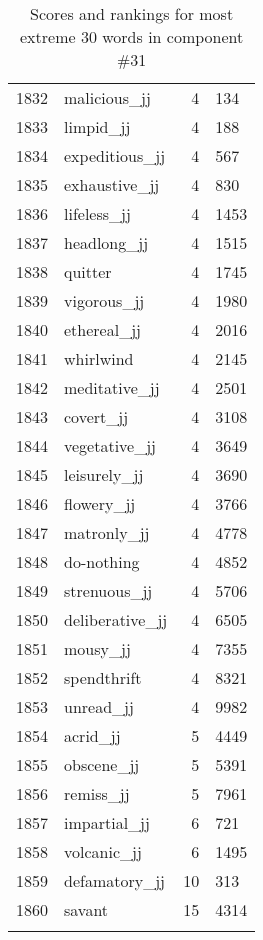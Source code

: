 \begin{longtable}[!htbp]{| rlr@{.}l |}
    1832 & malicious\_jj & 4 & 134 \\
    1833 & limpid\_jj & 4 & 188 \\
    1834 & expeditious\_jj & 4 & 567 \\
    1835 & exhaustive\_jj & 4 & 830 \\
    1836 & lifeless\_jj & 4 & 1453 \\
    1837 & headlong\_jj & 4 & 1515 \\
    1838 & quitter & 4 & 1745 \\
    1839 & vigorous\_jj & 4 & 1980 \\
    1840 & ethereal\_jj & 4 & 2016 \\
    1841 & whirlwind & 4 & 2145 \\
    1842 & meditative\_jj & 4 & 2501 \\
    1843 & covert\_jj & 4 & 3108 \\
    1844 & vegetative\_jj & 4 & 3649 \\
    1845 & leisurely\_jj & 4 & 3690 \\
    1846 & flowery\_jj & 4 & 3766 \\
    1847 & matronly\_jj & 4 & 4778 \\
    1848 & do-nothing & 4 & 4852 \\
    1849 & strenuous\_jj & 4 & 5706 \\
    1850 & deliberative\_jj & 4 & 6505 \\
    1851 & mousy\_jj & 4 & 7355 \\
    1852 & spendthrift & 4 & 8321 \\
    1853 & unread\_jj & 4 & 9982 \\
    1854 & acrid\_jj & 5 & 4449 \\
    1855 & obscene\_jj & 5 & 5391 \\
    1856 & remiss\_jj & 5 & 7961 \\
    1857 & impartial\_jj & 6 & 721 \\
    1858 & volcanic\_jj & 6 & 1495 \\
    1859 & defamatory\_jj & 10 & 313 \\
    1860 & savant & 15 & 4314 \\
    \hline
    \caption{Scores and rankings for most extreme 30 words in component \#31} \\
\end{longtable}
